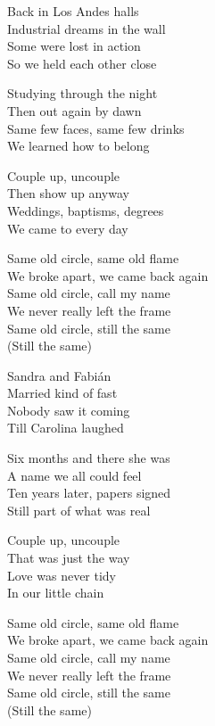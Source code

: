 \begin{lyrics}

Back in Los Andes halls\\
Industrial dreams in the wall\\
Some were lost in action\\
So we held each other close

Studying through the night\\
Then out again by dawn\\
Same few faces, same few drinks\\
We learned how to belong

Couple up, uncouple\\
Then show up anyway\\
Weddings, baptisms, degrees\\
We came to every day

Same old circle, same old flame\\
We broke apart, we came back again\\
Same old circle, call my name\\
We never really left the frame\\
Same old circle, still the same\\
(Still the same)

Sandra and Fabián\\
Married kind of fast\\
Nobody saw it coming\\
Till Carolina laughed

Six months and there she was\\
A name we all could feel\\
Ten years later, papers signed\\
Still part of what was real

Couple up, uncouple\\
That was just the way\\
Love was never tidy\\
In our little chain

Same old circle, same old flame\\
We broke apart, we came back again\\
Same old circle, call my name\\
We never really left the frame\\
Same old circle, still the same\\
(Still the same)


\end{lyrics}
